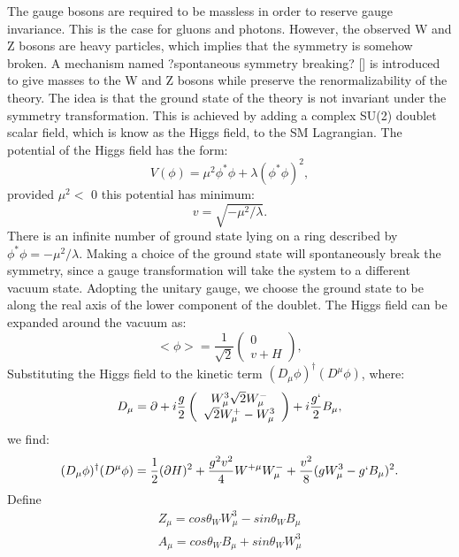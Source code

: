 \documentclass[thesis.tex]{subfiles}
\begin{document}
The gauge bosons are required to be massless in order to reserve gauge invariance. 
This is the case for gluons and photons. However, the observed W and Z bosons are heavy particles, which implies that the symmetry is somehow broken. 
A mechanism named ?spontaneous symmetry breaking? [] is introduced to give masses to the W and Z bosons while preserve the renormalizability of the theory. 
The idea is that the ground state of the theory is not invariant under the symmetry transformation.
This is achieved by adding a complex SU(2) doublet scalar field, which is know as the Higgs field, to the SM Lagrangian. 
The potential of the Higgs field has the form: 
	\begin{equation}
		V(\phi) = \mu^2\phi^*\phi + \lambda(\phi^*\phi)^2,
	\end{equation}
provided $\mu^2 <$ 0 this potential has minimum: 
	\begin{equation}
		v = \sqrt{ -\mu^2/\lambda}.
	\end{equation}
There is an infinite number of ground state lying on a ring described by $\phi^*\phi = - \mu^2/\lambda$. 
Making a choice of the ground state will spontaneously break the symmetry, since a gauge transformation will take the system to a different vacuum state. 
Adopting the unitary gauge, we choose the ground state to be along the real axis of the lower component of the doublet.
The Higgs field can be expanded around the vacuum as:
	\begin{equation}
		<\phi> = \frac{1}{\sqrt{2}} \left( \begin{array}{c} 0\\v+H \end{array} \right),
	\end{equation}
Substituting the Higgs field to the kinetic term $(D_\mu \phi)^\dagger(D^\mu\phi)$, where:
	\begin{equation}
		D_\mu = \partial + i\frac{g}{2}\left(  \begin{array}{c} W_\mu^3   \sqrt{2}W_\mu^- \\ \sqrt{2}W_\mu^+  -W_\mu^3 \end{array} \right) + i\frac{g`}{2}B_\mu, 
	\end{equation}
we find:
	\begin{equation}
		(D_\mu \phi)^\dagger(D^\mu\phi) = \frac{1}{2}(\partial H)^2 + \frac{g^2v^2}{4}W^{+\mu}W_{\mu}^- + \frac{v^2}{8}(gW_\mu^3 - g`B_\mu)^2.
	\end{equation}
Define
	\begin{equation}
	\begin{array}{c}
		Z_\mu = cos\theta_W W_\mu^3 - sin \theta_W B_\mu \\
		A_\mu = cos\theta_W B_\mu + sin\theta_W W_\mu^3
	\end{array}
	\end{equation}
\end{document}
